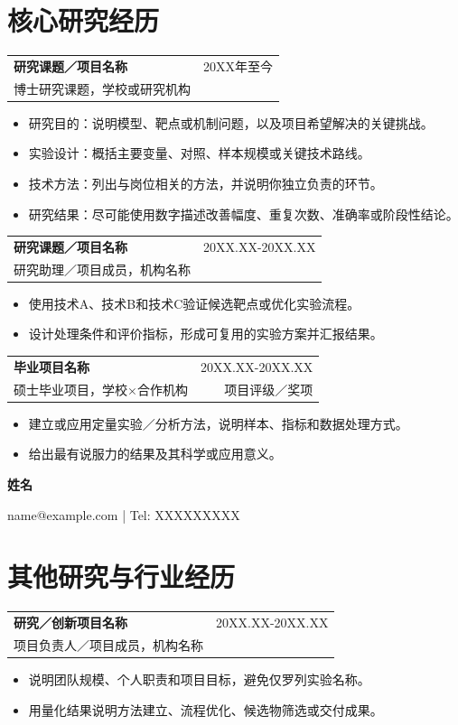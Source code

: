 \documentclass[a4paper,11pt]{article}
\makeatletter
\newcommand{\cvheading}[4]{%
  \par\addvspace{5pt}\noindent\begin{tabularx}{\linewidth}{@{}>{\raggedright\arraybackslash}Xr@{}}
    \textbf{#1} & \color{muted}\small #2 \\
    #3 & \color{muted}\small #4
  \end{tabularx}\par\vspace{-1pt}}
\newcommand{\cvheadingfirst}[4]{%
  \par\noindent\begin{tabularx}{\linewidth}{@{}>{\raggedright\arraybackslash}Xr@{}}
    \textbf{#1} & \color{muted}\small #2 \\
    #3 & \color{muted}\small #4
  \end{tabularx}\par\vspace{-1pt}}
\newenvironment{cvitems}{%
  \begin{itemize}[leftmargin=4.6mm,label=\raisebox{0.25ex}{\tiny$\bullet$},itemsep=2.2pt,topsep=2.4pt,parsep=0pt,partopsep=0pt]\justifying
}{\end{itemize}\vspace{2pt}}
\makeatother
\begin{document}
\section{核心研究经历}
\cvheadingfirst{研究课题／项目名称}{20XX年至今}{博士研究课题，学校或研究机构}{ }
\begin{cvitems}
  \item 研究目的：说明模型、靶点或机制问题，以及项目希望解决的关键挑战。
  \item 实验设计：概括主要变量、对照、样本规模或关键技术路线。
  \item 技术方法：列出与岗位相关的方法，并说明你独立负责的环节。
  \item 研究结果：尽可能使用数字描述改善幅度、重复次数、准确率或阶段性结论。
\end{cvitems}

\cvheading{研究课题／项目名称}{20XX.XX-20XX.XX}{研究助理／项目成员，机构名称}{ }
\begin{cvitems}
  \item 使用技术A、技术B和技术C验证候选靶点或优化实验流程。
  \item 设计处理条件和评价指标，形成可复用的实验方案并汇报结果。
\end{cvitems}

\cvheading{毕业项目名称}{20XX.XX-20XX.XX}{硕士毕业项目，学校×合作机构}{项目评级／奖项}
\begin{cvitems}
  \item 建立或应用定量实验／分析方法，说明样本、指标和数据处理方式。
  \item 给出最有说服力的结果及其科学或应用意义。
\end{cvitems}

\newpage
\begin{flushright}
  {\Large\bfseries 姓名}\par
  \vspace{2pt}
  {\color{muted}\small name@example.com \enspace | \enspace Tel: XXXXXXXXX}
\end{flushright}
\vspace{-10pt}

\section{其他研究与行业经历}
\cvheadingfirst{研究／创新项目名称}{20XX.XX-20XX.XX}{项目负责人／项目成员，机构名称}{ }
\begin{cvitems}
  \item 说明团队规模、个人职责和项目目标，避免仅罗列实验名称。
  \item 用量化结果说明方法建立、流程优化、候选物筛选或交付成果。
\end{cvitems}
\end{document}
